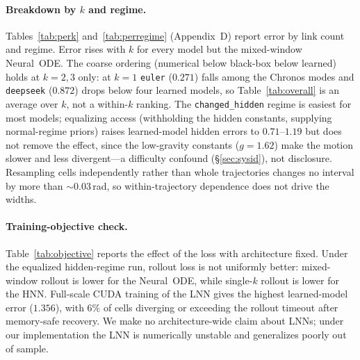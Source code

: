 \documentclass{article}
\begin{document}

\paragraph{Breakdown by $k$ and regime.}
\label{sec:breakdown}
Tables~\ref{tab:perk} and~\ref{tab:perregime} (Appendix~D) report error by link count and regime.
Error rises with $k$ for every model but the mixed-window Neural~ODE. The coarse ordering
(numerical below black-box below learned) holds at $k{=}2,3$ only: at $k{=}1$ \texttt{euler}
($0.271$) falls among the Chronos modes and \texttt{deepseek} ($0.872$) drops below four learned
models, so Table~\ref{tab:overall} is an average over $k$, not a within-$k$ ranking. The
\texttt{changed\_hidden} regime is easiest for most models; equalizing access (withholding the
hidden constants, supplying normal-regime priors) raises learned-model hidden errors to
$0.71$--$1.19$ but does not remove the effect, since the low-gravity constants ($g{=}1.62$) make
the motion slower and less divergent---a difficulty confound (\S\ref{sec:sysid}), not disclosure.
Resampling cells independently rather than whole trajectories changes no interval by more than
${\sim}0.03$\,rad, so within-trajectory dependence does not drive the widths.

\paragraph{Training-objective check.}
\label{sec:objective}
Table~\ref{tab:objective} reports the effect of the loss with architecture fixed. Under the
equalized hidden-regime run, rollout loss is not uniformly better: mixed-window rollout
is lower for the Neural~ODE, while single-$k$ rollout is lower for the HNN. Full-scale CUDA
training of the LNN gives the highest learned-model error ($1.356$), with $6\%$ of cells
diverging or exceeding the rollout timeout after memory-safe recovery. We make no
architecture-wide claim about LNNs; under our implementation the LNN is
numerically unstable and generalizes poorly out of sample.
\end{document}
